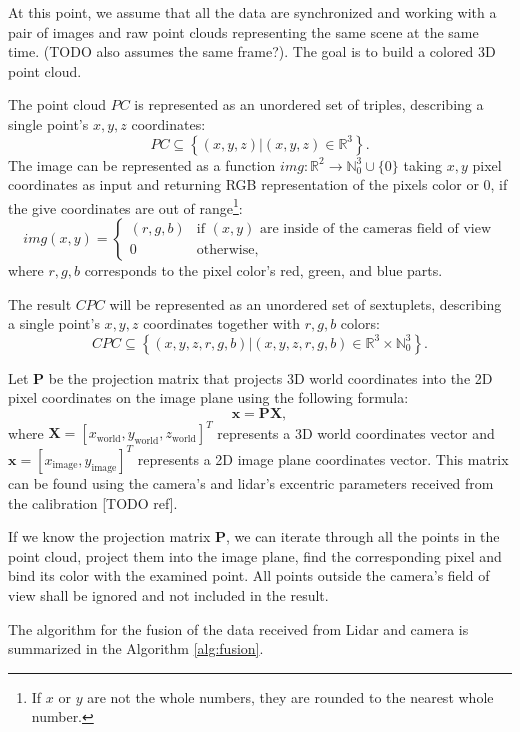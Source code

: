 At this point, we assume that all the data are synchronized and working with a pair of images and raw point clouds representing the same scene at the same time. (TODO also assumes the same frame?). The goal is to build a colored 3D point cloud.\par
The point cloud $PC$ is represented as an unordered set of triples, describing a single point's $x, y, z$ coordinates:
$$
    PC \subseteq \left\{ (x,y,z) | (x,y,z) \in \mathbb{R}^3\right\}.
$$
The image can be represented as a function $img: \mathbb{R}^2 \rightarrow \mathbb{N}_0^3 \cup \{0\}$ taking $x,y$ pixel coordinates as input and returning RGB representation of the pixels color or 0, if the give coordinates are out of range\footnote{If $x$ or $y$ are not the whole numbers, they are rounded to the nearest whole number.}:
$$
    img(x,y) = \begin{cases}
        (r,g,b) & \text{if $(x,y)$ are inside of the cameras field of view} \\
        0       & \text{otherwise,}
    \end{cases}
$$
where $r,g,b$ corresponds to the pixel color's red, green, and blue parts.\par
The result $CPC$ will be represented as an unordered set of sextuplets, describing a single point's $x, y, z$ coordinates together with $r, g, b$ colors:
$$
    CPC \subseteq \left\{ (x,y,z,r,g,b) | (x,y,z,r,g,b) \in \mathbb{R}^3 \times \mathbb{N}_0^3 \right\}.
$$\par
Let $\mathbf{P}$ be the projection matrix that projects 3D world coordinates into the 2D pixel coordinates on the image plane using the following formula:
$$
    \mathbf{x} = \mathbf{P}\mathbf{X},
$$
where $\mathbf{X} = \left[x_\text{world},y_\text{world},z_\text{world}\right]^T$ represents a 3D world coordinates vector and $\mathbf{x} = \left[x_\text{image}, y_\text{image}\right]^T$ represents a 2D image plane coordinates vector. This matrix can be found using the camera's and lidar's excentric parameters received from the calibration [TODO ref].\par
If we know the projection matrix $\mathbf{P}$, we can iterate through all the points in the point cloud, project them into the image plane, find the corresponding pixel and bind its color with the examined point. All points outside the camera's field of view shall be ignored and not included in the result.\par
The algorithm for the fusion of the data received from Lidar and camera is summarized in the Algorithm \ref{alg:fusion}.

